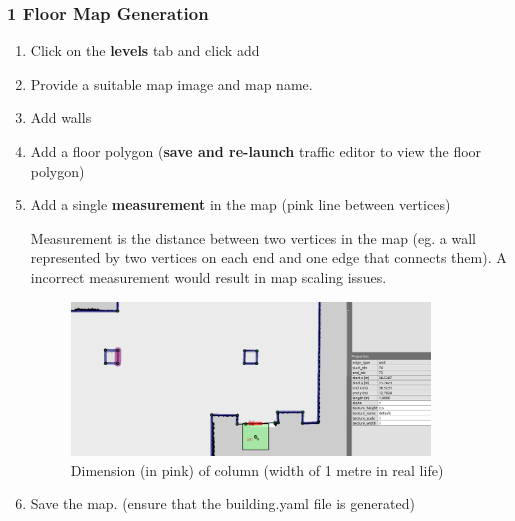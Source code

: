 \documentclass[11pt]{article}
\begin{document}
\subsubsection{1 Floor Map Generation}
\begin{enumerate}
 \item {Click on the \textbf{levels} tab and click add}
 \item {Provide a suitable map image and map name.}
 \item {Add walls}
 \item {Add a floor polygon (\textbf{save and re-launch} traffic editor to view the floor polygon)}
 \item {
       Add a single \textbf{measurement} in the map (pink line between vertices)
       
       Measurement is the distance between two vertices in the map (eg. a wall represented by two vertices on each end and one edge that connects them). A incorrect measurement would result in map scaling issues.
       
       \begin{figure}[H]
        \centering
        \includegraphics[width=0.9\textwidth]{images/dimension}
        \caption{Dimension (in pink) of column (width of 1 metre in real life)}
       \end{figure}
       }
 \item {Save the map. (ensure that the building.yaml file is generated)}
\end{enumerate}
\end{document}
